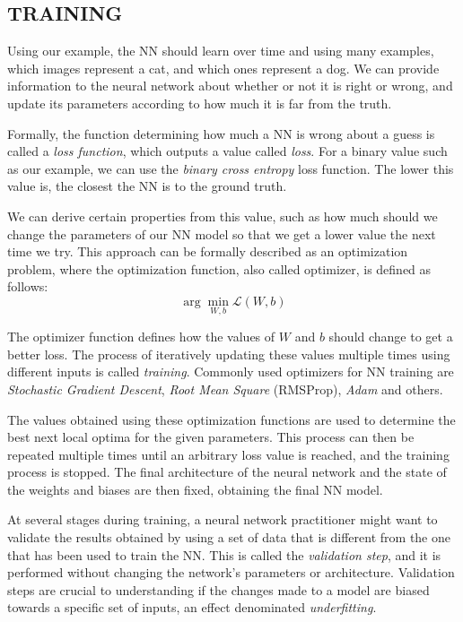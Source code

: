 \subsection{TRAINING}

Using our example, the NN should learn over time and using many examples, which images represent a cat, and which ones represent a dog.
We can provide information to the neural network about whether or not it is right or wrong, and update its parameters according to how much it is far from the truth.

Formally, the function determining how much a NN is wrong about a guess is called a \textit{loss function}, which outputs a value called \textit{loss}.
For a binary value such as our example, we can use the \textit{binary cross entropy} loss function.
The lower this value is, the closest the NN is to the ground truth.

We can derive certain properties from this value, such as how much should we change the parameters of our NN model so that we get a lower value the next time we try.
This approach can be formally described as an optimization problem, where the optimization function, also called optimizer, is defined as follows:
\begin{equation}
    \arg \min_{W, b} \mathcal{L} (W, b)
\end{equation}

The optimizer function defines how the values of $W$ and $b$ should change to get a better loss.
The process of iteratively updating these values multiple times using different inputs is called \textit{training}.
Commonly used optimizers for NN training are \textit{Stochastic Gradient Descent}, \textit{Root Mean Square} (RMSProp), \textit{Adam} and others.

The values obtained using these optimization functions are used to determine the best next local optima for the given parameters.
This process can then be repeated multiple times until an arbitrary loss value is reached, and the training process is stopped.
The final architecture of the neural network and the state of the weights and biases are then fixed, obtaining the final NN model.

At several stages during training, a neural network practitioner might want to validate the results obtained by using a set of data that is different from the one that has been used to train the NN.
This is called the \textit{validation step}, and it is performed without changing the network's parameters or architecture.
Validation steps are crucial to understanding if the changes made to a model are biased towards a specific set of inputs, an effect denominated \textit{underfitting}.


